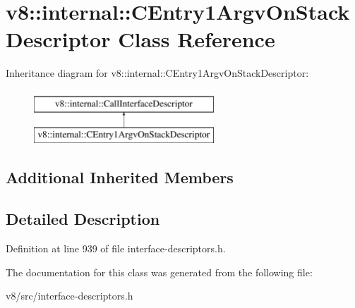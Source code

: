 \hypertarget{classv8_1_1internal_1_1CEntry1ArgvOnStackDescriptor}{}\section{v8\+:\+:internal\+:\+:C\+Entry1\+Argv\+On\+Stack\+Descriptor Class Reference}
\label{classv8_1_1internal_1_1CEntry1ArgvOnStackDescriptor}
Inheritance diagram for v8\+:\+:internal\+:\+:C\+Entry1\+Argv\+On\+Stack\+Descriptor\+:\begin{figure}[H]
\begin{center}
\leavevmode
\includegraphics[height=2.000000cm]{classv8_1_1internal_1_1CEntry1ArgvOnStackDescriptor}
\end{center}
\end{figure}
\subsection*{Additional Inherited Members}


\subsection{Detailed Description}


Definition at line 939 of file interface-\/descriptors.\+h.



The documentation for this class was generated from the following file\+:\begin{DoxyCompactItemize}
\item 
v8/src/interface-\/descriptors.\+h\end{DoxyCompactItemize}
